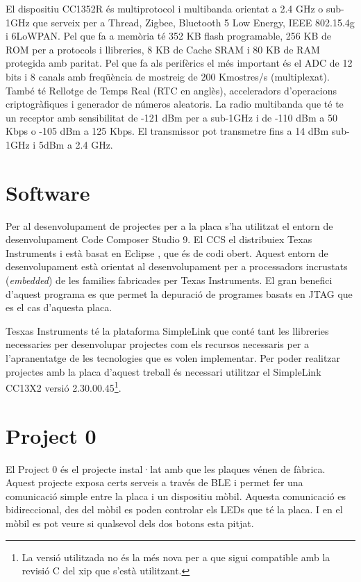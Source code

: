 El dispositiu CC1352R és multiprotocol i multibanda orientat a 2.4 GHz o sub-1GHz que serveix per a Thread, Zigbee, Bluetooth 5 Low Energy, IEEE 802.15.4g i 6LoWPAN. Pel que fa a memòria té 352 KB flash programable, 256 KB de ROM per a protocols i llibreries, 8 KB de Cache SRAM i 80 KB de RAM protegida amb paritat.
Pel que fa als perifèrics el més important és el ADC de 12 bits i 8 canals amb freqüència de mostreig de 200 Kmostres/s (multiplexat). També té Rellotge de Temps Real (RTC en anglès), acceleradors d'operacions criptogràfiques i generador de números aleatoris.
La radio multibanda que té te un receptor amb sensibilitat de -121 dBm per a sub-1GHz i de -110 dBm a 50 Kbps o -105 dBm a 125 Kbps. El transmissor pot transmetre fins a 14 dBm sub-1GHz i 5dBm a 2.4 GHz.


\section{Software}
Per al desenvolupament de projectes per a la placa s'ha utilitzat el entorn de desenvolupament Code Composer Studio 9. 
El CCS el distribuiex Texas Instruments i està basat en Eclipse \cite{eclipse}, que és de codi obert.
Aquest entorn de desenvolupament està orientat al desenvolupament per a processadors incrustats (\textit{embedded}) de les families fabricades per Texas Instruments.
El gran benefici d'aquest programa es que permet la depuració de programes basats en JTAG que es el cas d'aquesta placa.

Tesxas Instruments té la plataforma SimpleLink que conté tant les llibreries necessaries per desenvolupar projectes com els recursos necessaris per a l'apranentatge de les tecnologies que es volen implementar.
Per poder realitzar projectes amb la placa d'aquest treball és necessari utilitzar el SimpleLink CC13X2 versió 2.30.00.45\footnote{La versió utilitzada no és la més nova per a que sigui compatible amb la revisió C del xip que s'està utilitzant.}.

\section{Project 0}
El Project 0 és el projecte instal·lat amb que les plaques vénen de fàbrica.
Aquest projecte exposa certs serveis a través de BLE i permet fer una comunicació simple entre la placa i un dispositiu mòbil.
Aquesta comunicació es bidireccional, des del mòbil es poden controlar els LEDs que té la placa.
I en el mòbil es pot veure si qualsevol dels dos botons esta pitjat.

